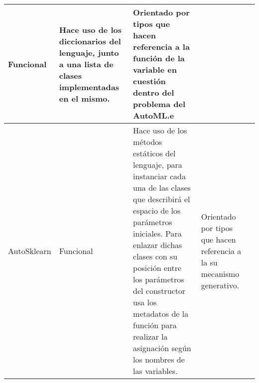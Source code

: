 \begin{longtable}{  p{2.15cm}  p{2.4cm}  p{4.75cm}  p{4.65cm}  p{5.45cm} }
    Funcional                                                                                                                                                                                                                                                                                                                    &
    Hace uso de los diccionarios del lenguaje, junto a una lista de clases implementadas en el mismo.                                                                                                                                                                                                                             &
    Orientado por tipos que hacen referencia a la función de la variable en cuestión dentro del problema del AutoML.e                                                                                                                                                                                                              &
    \\
    \hline
    \rowcolor{lavender}
    AutoSklearn                                                                                                                                                                                                                                                                                                                  &
    Funcional                                                                                                                                                                                                                                                                                                                    &
    Hace uso de los métodos estáticos del lenguaje, para instanciar cada una de las clases que describirá el espacio de los parámetros iniciales. Para enlazar dichas clases con su posición entre los parámetros del constructor usa los metadatos de la función para realizar la asignación según los nombres de las variables. &
    Orientado por tipos que hacen referencia a la su mecanismo generativo.                                                                                                                                                                                                                                                        &
    \\

\end{longtable}
